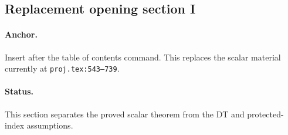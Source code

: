 \subsection{Replacement opening section I}

\paragraph{Anchor.}
Insert after the table of contents command.  This replaces the scalar
material currently at \texttt{proj.tex:543--739}.

\paragraph{Status.}
This section separates the proved scalar theorem from the DT and
protected-index assumptions.

